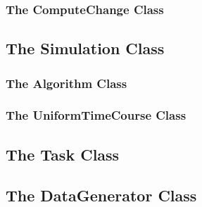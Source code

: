   \subsubsection[ComputeChange]{The ComputeChange Class}
  


 \subsection[Simulation]{The Simulation Class}
 

 \subsubsection[Algorithm]{The Algorithm Class}
 

 \subsubsection[UniformTimeCourse]{The UniformTimeCourse Class}
 


%

%

 \newpage
 \subsection[Task]{The Task Class}
 


 \newpage
 \subsection[DataGenerator]{The DataGenerator Class}
 

